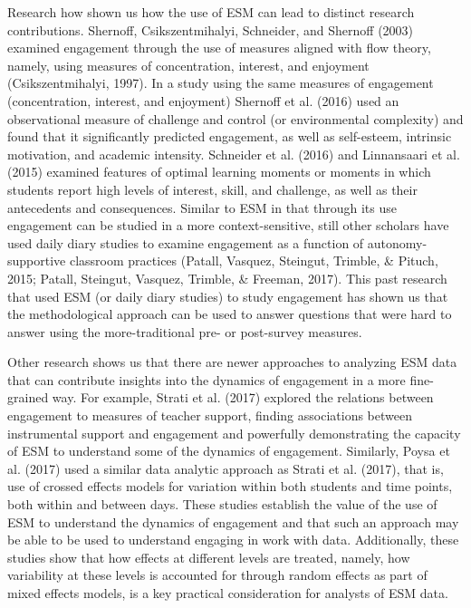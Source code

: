 \documentclass[]{msu-thesis}
\theoremstyle{definition}
\theoremstyle{definition}
\theoremstyle{definition}
\theoremstyle{remark}
\begin{document}
Research how shown us how the use of ESM can lead to distinct research
contributions. Shernoff, Csikszentmihalyi, Schneider, and Shernoff
(2003) examined engagement through the use of measures aligned with flow
theory, namely, using measures of concentration, interest, and enjoyment
(Csikszentmihalyi, 1997). In a study using the same measures of
engagement (concentration, interest, and enjoyment) Shernoff et al.
(2016) used an observational measure of challenge and control (or
environmental complexity) and found that it significantly predicted
engagement, as well as self-esteem, intrinsic motivation, and academic
intensity. Schneider et al. (2016) and Linnansaari et al. (2015)
examined features of optimal learning moments or moments in which
students report high levels of interest, skill, and challenge, as well
as their antecedents and consequences. Similar to ESM in that through
its use engagement can be studied in a more context-sensitive, still
other scholars have used daily diary studies to examine engagement as a
function of autonomy-supportive classroom practices (Patall, Vasquez,
Steingut, Trimble, \& Pituch, 2015; Patall, Steingut, Vasquez, Trimble,
\& Freeman, 2017). This past research that used ESM (or daily diary
studies) to study engagement has shown us that the methodological
approach can be used to answer questions that were hard to answer using
the more-traditional pre- or post-survey measures.

Other research shows us that there are newer approaches to analyzing ESM
data that can contribute insights into the dynamics of engagement in a
more fine-grained way. For example, Strati et al. (2017) explored the
relations between engagement to measures of teacher support, finding
associations between instrumental support and engagement and powerfully
demonstrating the capacity of ESM to understand some of the dynamics of
engagement. Similarly, Poysa et al. (2017) used a similar data analytic
approach as Strati et al. (2017), that is, use of crossed effects models
for variation within both students and time points, both within and
between days. These studies establish the value of the use of ESM to
understand the dynamics of engagement and that such an approach may be
able to be used to understand engaging in work with data. Additionally,
these studies show that how effects at different levels are treated,
namely, how variability at these levels is accounted for through random
effects as part of mixed effects models, is a key practical
consideration for analysts of ESM data.
\end{document}
